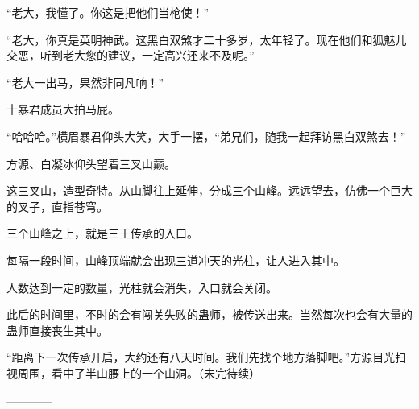 \begin{this_body}
“老大，我懂了。你这是把他们当枪使！”

“老大，你真是英明神武。这黑白双煞才二十多岁，太年轻了。现在他们和狐魅儿交恶，听到老大您的建议，一定高兴还来不及呢。”

“老大一出马，果然非同凡响！”

十暴君成员大拍马屁。

“哈哈哈。”横眉暴君仰头大笑，大手一摆，“弟兄们，随我一起拜访黑白双煞去！”

方源、白凝冰仰头望着三叉山巅。

这三叉山，造型奇特。从山脚往上延伸，分成三个山峰。远远望去，仿佛一个巨大的叉子，直指苍穹。

三个山峰之上，就是三王传承的入口。

每隔一段时间，山峰顶端就会出现三道冲天的光柱，让人进入其中。

人数达到一定的数量，光柱就会消失，入口就会关闭。

此后的时间里，不时的会有闯关失败的蛊师，被传送出来。当然每次也会有大量的蛊师直接丧生其中。

“距离下一次传承开启，大约还有八天时间。我们先找个地方落脚吧。”方源目光扫视周围，看中了半山腰上的一个山洞。（未完待续）

------------

\end{this_body}

